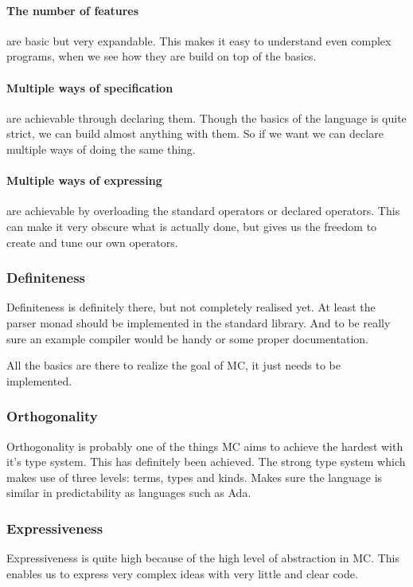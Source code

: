 \begin{multicols}{2}
   \paragraph{The number of features}
   are basic but very expandable.
   This makes it easy to understand even complex programs, when we see how they are build on top of the basics.

   \paragraph{Multiple ways of specification}
   are achievable through declaring them.
   Though the basics of the language is quite strict, we can build almost anything with them.
   So if we want we can declare multiple ways of doing the same thing.

   \paragraph{Multiple ways of expressing}
   are achievable by overloading the standard operators or declared operators.
   This can make it very obscure what is actually done, but gives us the freedom to create and tune our own operators.

   \subsubsection{Definiteness}
   Definiteness is definitely there, but not completely realised yet.
   At least the parser monad should be implemented in the standard library.
   And to be really sure an example compiler would be handy or some proper documentation.

   All the basics are there to realize the goal of MC, it just needs to be implemented.

   \subsubsection{Orthogonality}
   Orthogonality is probably one of the things MC aims to achieve the hardest with it's type system.
   This has definitely been achieved.
   The strong type system which makes use of three levels: terms, types and kinds.
   Makes sure the language is similar in predictability as languages such as Ada.

   \subsubsection{Expressiveness}
   Expressiveness is quite high because of the high level of abstraction in MC.
   This enables us to express very complex ideas with very little and clear code.


\end{multicols}
